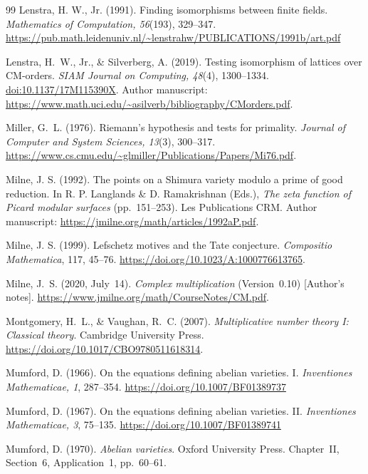 \documentclass[11pt]{article}
\theoremstyle{definition}
\theoremstyle{remark}
\begin{document}
\begin{thebibliography}{99}
Lenstra, H. W., Jr. (1991). Finding isomorphisms between finite fields.
\emph{Mathematics of Computation, 56}(193), 329--347.
\url{https://pub.math.leidenuniv.nl/~lenstrahw/PUBLICATIONS/1991b/art.pdf}

Lenstra, H.~W., Jr., \& Silverberg, A. (2019).
Testing isomorphism of lattices over CM-orders.
\emph{SIAM Journal on Computing, 48}(4), 1300--1334.
\href{https://doi.org/10.1137/17M115390X}{doi:10.1137/17M115390X}.
Author manuscript:
\url{https://www.math.uci.edu/~asilverb/bibliography/CMorders.pdf}.

Miller, G.~L. (1976). Riemann's hypothesis and tests for primality.
\emph{Journal of Computer and System Sciences, 13}(3), 300--317.
\url{https://www.cs.cmu.edu/~glmiller/Publications/Papers/Mi76.pdf}.

Milne, J. S. (1992). The points on a Shimura variety modulo a prime of
good reduction. In R. P. Langlands \& D. Ramakrishnan (Eds.),
\emph{The zeta function of Picard modular surfaces} (pp.~151--253).
Les Publications CRM. Author manuscript:
\url{https://jmilne.org/math/articles/1992aP.pdf}.

Milne, J. S. (1999). Lefschetz motives and the Tate conjecture.
\emph{Compositio Mathematica}, 117, 45--76.
\url{https://doi.org/10.1023/A:1000776613765}.

Milne, J.~S. (2020, July~14).
\emph{Complex multiplication} (Version~0.10) [Author's notes].
\url{https://www.jmilne.org/math/CourseNotes/CM.pdf}.

Montgomery, H.~L., \& Vaughan, R.~C. (2007).
\emph{Multiplicative number theory I: Classical theory}.
Cambridge University Press.
\url{https://doi.org/10.1017/CBO9780511618314}.

Mumford, D. (1966). On the equations defining abelian varieties. I.
\emph{Inventiones Mathematicae, 1}, 287--354.
\url{https://doi.org/10.1007/BF01389737}

Mumford, D. (1967). On the equations defining abelian varieties. II.
\emph{Inventiones Mathematicae, 3}, 75--135.
\url{https://doi.org/10.1007/BF01389741}

Mumford, D. (1970). \emph{Abelian varieties}.
Oxford University Press. Chapter~II, Section~6, Application~1,
pp.~60--61.


\end{thebibliography}
\end{document}

